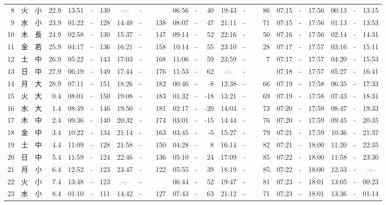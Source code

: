 \documentclass[12pt,a4j]{jsarticle}
\begin{document}
\begin{table}[htbp]
\begin{center}
{\begin{tabular}{|rc|cr|ccrccr|ccrccr|ccc|ccc|}
 8 & 火 & 小 & 22.9 &  13:51 &-& 130 &  --:-- &-&~~~~~ &  06:56 &-&  40 &  19:43 &-&  86 & 07:15 & -& 17:56 & 00:13 & -& 13:15 \\
 9 & 水 & 小 & 23.9 &  01:22 &-& 128 &  14:48 &-& 138 &  08:07 &-&  47 &  21:11 &-&  71 & 07:15 & -& 17:56 & 01:13 & -& 13:53 \\
10 & 木 & 長 & 24.9 &  02:58 &-& 130 &  15:37 &-& 147 &  09:14 &-&  52 &  22:16 &-&  50 & 07:16 & -& 17:56 & 02:14 & -& 14:31 \\
11 & 金 & 若 & 25.9 &  04:17 &-& 136 &  16:21 &-& 158 &  10:14 &-&  55 &  23:10 &-&  28 & 07:17 & -& 17:57 & 03:16 & -& 15:11 \\
12 & 土 & 中 & 26.9 &  05:22 &-& 143 &  17:03 &-& 168 &  11:06 &-&  59 &  23:59 &-&   7 & 07:17 & -& 17:57 & 04:20 & -& 15:53 \\
13 & 日 & 中 & 27.9 &  06:19 &-& 149 &  17:44 &-& 176 &  11:53 &-&  62 &  --:-- &-&~~~~~ & 07:18 & -& 17:57 & 05:27 & -& 16:41 \\
14 & 月 & 大 & 28.9 &  07:11 &-& 151 &  18:26 &-& 182 &  00:46 &-&  -8 &  12:38 &-&  66 & 07:19 & -& 17:58 & 06:35 & -& 17:33 \\
15 & 火 & 大 &  0.4 &  08:01 &-& 150 &  19:08 &-& 183 &  01:32 &-& -18 &  13:21 &-&  69 & 07:19 & -& 17:58 & 07:43 & -& 18:31 \\
16 & 水 & 大 &  1.4 &  08:49 &-& 146 &  19:50 &-& 181 &  02:17 &-& -20 &  14:03 &-&  73 & 07:20 & -& 17:59 & 08:47 & -& 19:33 \\
17 & 木 & 中 &  2.4 &  09:36 &-& 140 &  20:32 &-& 174 &  03:01 &-& -15 &  14:44 &-&  76 & 07:20 & -& 17:59 & 09:45 & -& 20:35 \\
18 & 金 & 中 &  3.4 &  10:22 &-& 134 &  21:14 &-& 163 &  03:45 &-&  -5 &  15:27 &-&  79 & 07:21 & -& 17:59 & 10:36 & -& 21:37 \\
19 & 土 & 中 &  4.4 &  11:09 &-& 128 &  21:58 &-& 150 &  04:28 &-&   8 &  16:14 &-&  82 & 07:21 & -& 18:00 & 11:20 & -& 22:35 \\
20 & 日 & 中 &  5.4 &  11:59 &-& 124 &  22:46 &-& 136 &  05:10 &-&  24 &  17:09 &-&  85 & 07:22 & -& 18:00 & 11:58 & -& 23:30 \\
21 & 月 & 小 &  6.4 &  12:52 &-& 123 &  23:47 &-& 122 &  05:55 &-&  39 &  18:19 &-&  85 & 07:22 & -& 18:00 & 12:33 & -& --:-- \\
22 & 火 & 小 &  7.4 &  13:48 &-& 123 &  --:-- &-&~~~~~ &  06:44 &-&  52 &  19:47 &-&  81 & 07:23 & -& 18:01 & 13:05 & -& 00:23 \\
23 & 水 & 小 &  8.4 &  01:10 &-& 111 &  14:42 &-& 127 &  07:43 &-&  63 &  21:12 &-&  71 & 07:23 & -& 18:01 & 13:36 & -& 01:14 \\

\end{tabular}}
\end{center}
\end{table}
\end{document}
